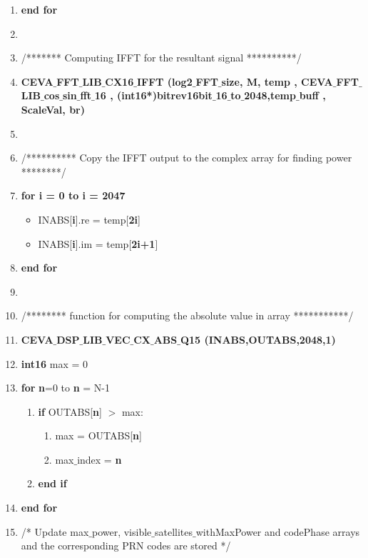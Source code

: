 \documentclass[journal,10pt,onecolumn]{article}
\begin{document}
\begin{enumerate}
\begin{enumerate}
\begin{itemize}
    \end{itemize}
    \item[] \textbf{end for}
    \item[] 
    \item[] /******* Computing IFFT for the resultant signal **********/
    \item[] \textbf{CEVA$\_$FFT$\_$LIB$\_$CX16$\_$IFFT (log2$\_$FFT$\_$size, M, temp , CEVA$\_$FFT$\_$LIB$\_$cos$\_$sin$\_$fft$\_$16 , (int16*)bitrev16bit$\_$16$\_$to$\_$2048,temp$\_$buff , ScaleVal, br)}
    \item[] 
    \item[] /********** Copy the IFFT output to the complex array for finding power ********/
    \item[] \textbf{for i = 0 to i = 2047}
    \begin{itemize}
        \item[] INABS[\textbf{i}].re    = temp[\textbf{2i}]
        \item[] INABS[\textbf{i}].im    = temp[\textbf{2i+1}]
    \end{itemize}
    \item[] \textbf{end for}
    \item[] 
    \item[]  /******** function for computing the absolute value in array ***********/
    \item[] \textbf{CEVA$\_$DSP$\_$LIB$\_$VEC$\_$CX$\_$ABS$\_$Q15 (INABS,OUTABS,2048,1)}
    \item[] \textbf{int16} max = 0
        \item[] \textbf{for} \textbf{n}=0 to \textbf{n} = N-1
        \begin{enumerate}
            \item[] \textbf{if} OUTABS[\textbf{n}] $>$ max:
            \begin{enumerate}
                \item[] max = OUTABS[\textbf{n}]
                \item[] max$\_$index = \textbf{n}
            \end{enumerate}
           \item[] \textbf{end if}
        \end{enumerate}
        \item[] \textbf{end for} \\
      \item[] /* Update max$\_$power, visible$\_$satellites$\_$withMaxPower and codePhase arrays and the corresponding PRN codes are stored */ \\


\end{enumerate}
\end{enumerate}
\end{document}
